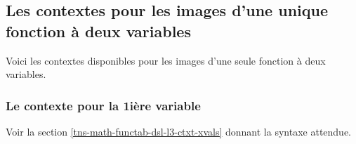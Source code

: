 \documentclass{tutodoc}
\begin{document}

\subsection{Les contextes pour les images d'une unique fonction à deux variables}

Voici les contextes disponibles pour les images d'une seule fonction à deux variables.

\medskip

\begin{itemize*}[before = \leavevmode\kern15pt, itemjoin = \kern15pt]
	\item {}

	\item {}

	\item {}
\end{itemize*}




\subsubsection{Le contexte  pour la 1ière variable}

Voir la section \ref{tns-math-functab-dsl-l3-ctxt-xvals} donnant la syntaxe attendue.
\end{document}
